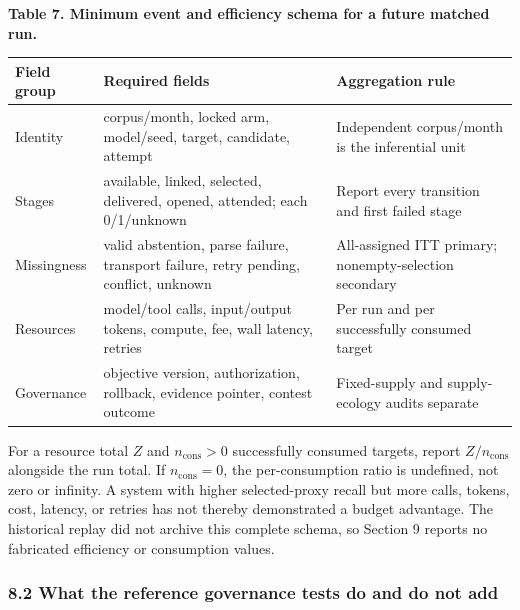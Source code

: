 \documentclass[
  11pt]{article}
\begin{document}
\textbf{Table 7. Minimum event and efficiency schema for a future
matched run.}

\begin{longtable}[]{@{}
  >{\raggedright\arraybackslash}p{}
  >{\raggedright\arraybackslash}p{}
  >{\raggedright\arraybackslash}p{}@{}}
\toprule\noalign{}
\begin{minipage}[b]{\linewidth}\raggedright
Field group
\end{minipage} & \begin{minipage}[b]{\linewidth}\raggedright
Required fields
\end{minipage} & \begin{minipage}[b]{\linewidth}\raggedright
Aggregation rule
\end{minipage} \\
\midrule\noalign{}
\endhead
\bottomrule\noalign{}
\endlastfoot
Identity & corpus/month, locked arm, model/seed, target, candidate,
attempt & Independent corpus/month is the inferential unit \\
Stages & available, linked, selected, delivered, opened, attended; each
0/1/unknown & Report every transition and first failed stage \\
Missingness & valid abstention, parse failure, transport failure, retry
pending, conflict, unknown & All-assigned ITT primary;
nonempty-selection secondary \\
Resources & model/tool calls, input/output tokens, compute, fee, wall
latency, retries & Per run and per successfully consumed target \\
Governance & objective version, authorization, rollback, evidence
pointer, contest outcome & Fixed-supply and supply-ecology audits
separate \\
\end{longtable}

For a resource total \(Z\) and \(n_{\mathrm{cons}}>0\) successfully
consumed targets, report \(Z/n_{\mathrm{cons}}\) alongside the run
total. If \(n_{\mathrm{cons}}=0\), the per-consumption ratio is
undefined, not zero or infinity. A system with higher selected-proxy
recall but more calls, tokens, cost, latency, or retries has not thereby
demonstrated a budget advantage. The historical replay did not archive
this complete schema, so Section 9 reports no fabricated efficiency or
consumption values.

\subsubsection{8.2 What the reference governance tests do and do not
add}\label{what-the-reference-governance-tests-do-and-do-not-add}
\end{document}
